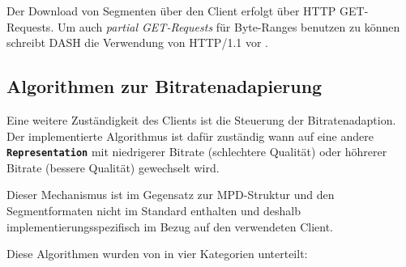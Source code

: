 \documentclass[paper = a4, fontsize = 12pt, parskip = half]{scrartcl} %
\def\elem#1{\texttt{\textbf{#1}}}
\begin{document}
Der Download von Segmenten über den Client erfolgt über HTTP GET-Requests. Um auch \textit{partial GET-Requests} für Byte-Ranges benutzen zu können schreibt DASH die Verwendung von HTTP/1.1 vor \cite{international_organization_for_standardization_isoiec_nodate}.

\subsection{Algorithmen zur Bitratenadapierung}
Eine weitere Zuständigkeit des Clients ist die Steuerung der Bitratenadaption. Der implementierte Algorithmus ist dafür zuständig wann auf eine andere \elem{Representation} mit niedrigerer Bitrate (schlechtere Qualität) oder höhrerer Bitrate (bessere Qualität) gewechselt wird.

Dieser Mechanismus ist im Gegensatz zur MPD-Struktur und den Segmentformaten nicht im Standard enthalten und deshalb implementierungsspezifisch im Bezug auf den verwendeten Client.

Diese Algorithmen wurden von \cite{bentaleb_survey_2019} in vier Kategorien unterteilt:
\end{document}
